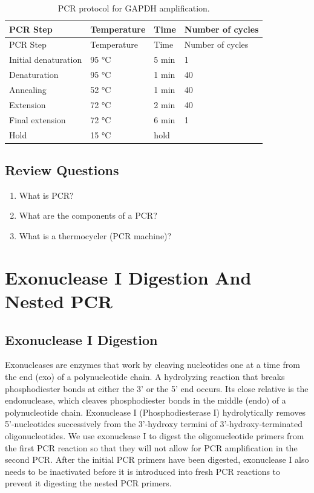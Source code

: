 \documentclass[]{book}
\providecommand{\tightlist}{%
  \setlength{\itemsep}{0pt}\setlength{\parskip}{0pt}}
\begin{document}
\begin{longtable}[]{@{}llll@{}}
\caption{\label{tab:pcr} PCR protocol for GAPDH amplification.}\tabularnewline
\toprule
PCR Step & Temperature & Time & Number of cycles\tabularnewline
\midrule
\endfirsthead
\toprule
PCR Step & Temperature & Time & Number of cycles\tabularnewline
\midrule
\endhead
Initial denaturation & 95 °C & 5 min & 1\tabularnewline
Denaturation & 95 °C & 1 min & 40\tabularnewline
Annealing & 52 °C & 1 min & 40\tabularnewline
Extension & 72 °C & 2 min & 40\tabularnewline
Final extension & 72 °C & 6 min & 1\tabularnewline
Hold & 15 °C & hold &\tabularnewline
\bottomrule
\end{longtable}

\hypertarget{review-questions-5}{%
\section{Review Questions}\label{review-questions-5}}

\begin{enumerate}
\def\labelenumi{\arabic{enumi}.}
\tightlist
\item
  What is PCR?
\item
  What are the components of a PCR?
\item
  What is a thermocycler (PCR machine)?
\end{enumerate}

\hypertarget{exonuclease-i-digestion-and-nested-pcr}{%
\chapter{Exonuclease I Digestion And Nested PCR}\label{exonuclease-i-digestion-and-nested-pcr}}

\hypertarget{exonuclease-i-digestion}{%
\section{Exonuclease I Digestion}\label{exonuclease-i-digestion}}

Exonucleases are enzymes that work by cleaving nucleotides one at a time from the end (exo) of a polynucleotide chain. A hydrolyzing reaction that breaks phosphodiester bonds at either the 3' or the 5' end occurs. Its close relative is the endonuclease, which cleaves phosphodiester bonds in the middle (endo) of a polynucleotide chain. Exonuclease I (Phosphodiesterase I) hydrolytically removes 5'-nucleotides successively from the 3'-hydroxy termini of 3'-hydroxy-terminated oligonucleotides. We use exonuclease I to digest the oligonucleotide primers from the first PCR reaction so that they will not allow for PCR amplification in the second PCR. After the initial PCR primers have been digested, exonuclease I also needs to be inactivated before it is introduced into fresh PCR reactions to prevent it digesting the nested PCR primers.
\end{document}
